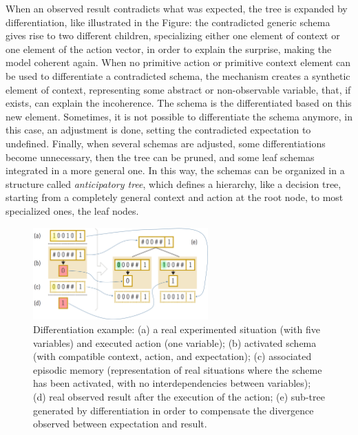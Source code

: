 \documentclass[runningheads]{llncs}
\begin{document}
When an observed result contradicts what was expected, the tree is expanded by differentiation, like illustrated in the Figure: the contradicted generic schema gives rise to two different children, specializing either one element of context or one element of the action vector, in order to explain the surprise, making the model coherent again.
When no primitive action or primitive context element can be used to differentiate a contradicted schema, the mechanism creates a synthetic element of context, representing some abstract or non-observable variable, that, if exists, can explain the incoherence. 
The schema is the differentiated based on this new element.
Sometimes, it is not possible to differentiate the schema anymore, in this case, an adjustment is done, setting the contradicted expectation to undefined.
Finally, when several schemas are adjusted, some differentiations become unnecessary, then the tree can be pruned, and some leaf schemas integrated in a more general one.
In this way, the schemas can be organized in a structure called \textit{anticipatory tree}, 
which defines a hierarchy, like a decision tree, starting from a completely general context and action at the root node, to most specialized ones, the leaf nodes.
%
\begin{figure}
	\centering
	\includegraphics[width=0.6\textwidth]{Figure_perotto_differentiation_arrows.png}
	\caption{Differentiation example: (a) a real experimented situation (with five variables) and executed action (one variable); (b) activated schema (with compatible context, action, and expectation); (c) associated episodic memory (representation of real situations where the scheme has been activated, with no interdependencies between variables);
(d) real observed result after the execution of the action; (e) sub-tree generated by differentiation in order to compensate the divergence observed between expectation and result.} 
	\label{fig:perotto_diff}
\end{figure}
\end{document}
